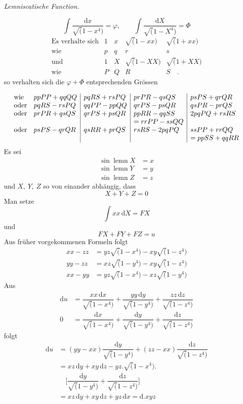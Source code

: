 \begin{center}\textit{Lemniscatische Function.}\end{center}
\[
\int\dfrac{\mathrm{d}x}{\surd(1-x^4)}=\varphi,
\qquad
\int\dfrac{\mathrm{d}X}{\surd(1-X^4)}=\Phi
\]
\[
\begin{array}{rcccc}
\text{Es verhalte sich}&1&x&\surd(1-xx)&\surd(1+xx)\\[5pt]
\text{wie}&p&q&r&s\\[7pt]
\text{und}&1&X&\surd(1-XX)&\surd(1+XX)\\[5pt]
\text{wie}&P&Q&R&S\quad.
\end{array}
\]
\noindent so verhalten sich die $\varphi+\Phi$ entsprechenden Grössen


\begingroup\small\setlength{\arraycolsep}{4pt}\[
\begin{array}{@{}ll|l|l|l@{}}
\text{wie}&ppPP+qqQQ&pqRS+rsPQ&prPR-qsQS&psPS+qrQR\\
\text{oder}&pqRS-rsPQ&qqPP-ppQQ&qrPS-psQR&qsPR-prQS\\
\text{oder}&prPR+qsQS&qrPS+psQR&ppRR-qqSS&2pqPQ+rsRS\\
&&&=rrPP-ssQQ&\\
\text{oder}&psPS-qrQR&qsRR+prQS&rsRS-2pqPQ&ssPP+rrQQ\\
&&&&=ppSS+qqRR
\end{array}
\]\endgroup
\noindent Es sei
\[
\begin{aligned}
\sin\operatorname{lemn}X&=x\\[5pt]
\sin\operatorname{lemn}Y&=y\\[5pt]
\sin\operatorname{lemn}Z&=z
\end{aligned}
\]
\noindent und $X,\ Y,\ Z$ so von einander abhängig, dass
\[
X+Y+Z=0
\]
\noindent Man setze
\[
\int xx\,\mathrm{d}X=FX
\]
\noindent und
\[
FX+FY+FZ=u
\]
\noindent Aus früher vorgekommenen Formeln folgt
\[
\begin{aligned}
xx-zz&=yz\surd(1-x^4)-xy\surd(1-z^4)\\[5pt]
yy-zz&=xz\surd(1-y^4)-xy\surd(1-z^4)\\[5pt]
xx-yy&=yz\surd(1-x^4)-xz\surd(1-y^4)
\end{aligned}
\]
\noindent Aus
\[
\begin{aligned}
\mathrm{d}u&=\dfrac{xx\,\mathrm{d}x}{\surd(1-x^4)}
+\dfrac{yy\,\mathrm{d}y}{\surd(1-y^4)}
+\dfrac{zz\,\mathrm{d}z}{\surd(1-z^4)}\\[5pt]
0&=\dfrac{\mathrm{d}x}{\surd(1-x^4)}
+\dfrac{\mathrm{d}y}{\surd(1-y^4)}
+\dfrac{\mathrm{d}z}{\surd(1-z^4)}
\end{aligned}
\]
\noindent folgt
\[
\begin{aligned}
\mathrm{d}u&=(yy-xx)\dfrac{\mathrm{d}y}{\surd(1-y^4)}
+(zz-xx)\dfrac{\mathrm{d}z}{\surd(1-z^4)}\\[5pt]
&=xz\,\mathrm{d}y+xy\,\mathrm{d}z-yz.\surd(1-x^4).
\\[7pt]&\quad{}\biggl[\dfrac{\mathrm{d}y}{\surd(1-y^4)}+\dfrac{\mathrm{d}z}{\surd(1-z^4)}\biggr]\\[5pt]
&=xz\,\mathrm{d}y+xy\,\mathrm{d}z+yz\,\mathrm{d}x=\mathrm{d}.xyz
\end{aligned}
\]
